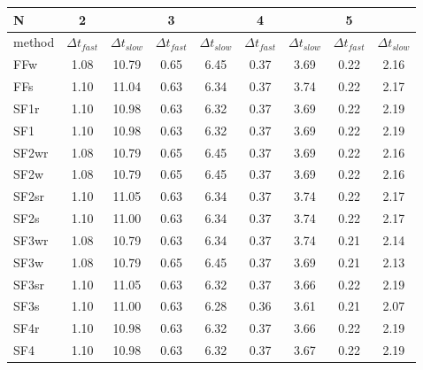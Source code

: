 \begin{tabular}{l|cc|cc|cc|cc}
N& 2  &  & 3  &  & 4  &  & 5  &  \\
\hline
method& $\Delta t_{fast}$  & $\Delta t_{slow}$& $\Delta t_{fast}$  & $\Delta t_{slow}$& $\Delta t_{fast}$  & $\Delta t_{slow}$& $\Delta t_{fast}$  & $\Delta t_{slow}$\\
\hline
FFw & 1.08 & 10.79 & 0.65 & 6.45 & 0.37 & 3.69 & 0.22 & 2.16 \\
FFs & 1.10 & 11.04 & 0.63 & 6.34 & 0.37 & 3.74 & 0.22 & 2.17 \\
SF1r & 1.10 & 10.98 & 0.63 & 6.32 & 0.37 & 3.69 & 0.22 & 2.19 \\
SF1 & 1.10 & 10.98 & 0.63 & 6.32 & 0.37 & 3.69 & 0.22 & 2.19 \\
SF2wr & 1.08 & 10.79 & 0.65 & 6.45 & 0.37 & 3.69 & 0.22 & 2.16 \\
SF2w & 1.08 & 10.79 & 0.65 & 6.45 & 0.37 & 3.69 & 0.22 & 2.16 \\
SF2sr & 1.10 & 11.05 & 0.63 & 6.34 & 0.37 & 3.74 & 0.22 & 2.17 \\
SF2s & 1.10 & 11.00 & 0.63 & 6.34 & 0.37 & 3.74 & 0.22 & 2.17 \\
SF3wr & 1.08 & 10.79 & 0.63 & 6.34 & 0.37 & 3.74 & 0.21 & 2.14 \\
SF3w & 1.08 & 10.79 & 0.65 & 6.45 & 0.37 & 3.69 & 0.21 & 2.13 \\
SF3sr & 1.10 & 11.05 & 0.63 & 6.32 & 0.37 & 3.66 & 0.22 & 2.19 \\
SF3s & 1.10 & 11.00 & 0.63 & 6.28 & 0.36 & 3.61 & 0.21 & 2.07 \\
SF4r & 1.10 & 10.98 & 0.63 & 6.32 & 0.37 & 3.66 & 0.22 & 2.19 \\
SF4 & 1.10 & 10.98 & 0.63 & 6.32 & 0.37 & 3.67 & 0.22 & 2.19 \\
\hline
\end{tabular}
